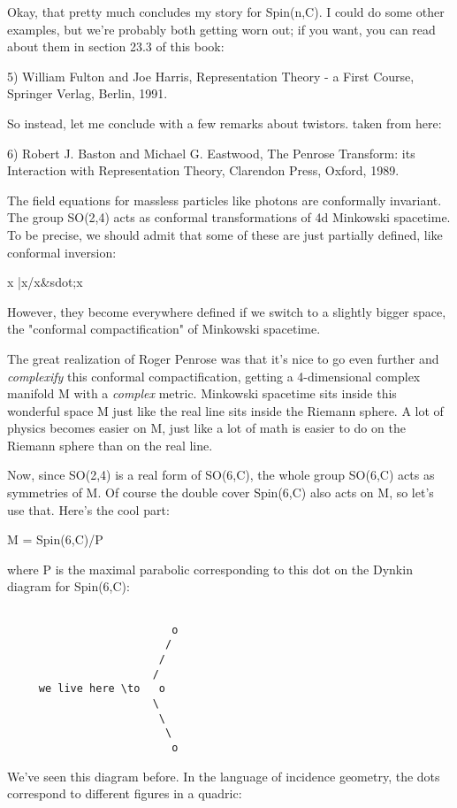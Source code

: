 Okay, that pretty much concludes my story for Spin(n,C).  I could
do some other examples, but we're probably both getting worn out;
if you want, you can read about them in section 23.3 of this book:

5)  William Fulton and Joe Harris, Representation Theory - a First
Course, Springer Verlag, Berlin, 1991.

So instead, let me conclude with a few remarks about twistors.
taken from here:

6) Robert J. Baston and Michael G. Eastwood, The Penrose Transform:
its Interaction with Representation Theory, Clarendon Press, Oxford,
1989.

The field equations for massless particles like photons are conformally
invariant.  The group SO(2,4) acts as conformal transformations of 4d
Minkowski spacetime.  To be precise, we should admit that some of these
are just partially defined, like conformal inversion:

x |\to  x/x&sdot;x

However, they become everywhere defined if we switch to a slightly
bigger space, the "conformal compactification" of Minkowski spacetime.

The great realization of Roger Penrose was that it's nice to go even
further and \emph{complexify} this conformal compactification, getting a
4-dimensional complex manifold M with a \emph{complex} metric.  Minkowski
spacetime sits inside this wonderful space M just like the real line
sits inside the Riemann sphere.  A lot of physics becomes easier on M,
just like a lot of math is easier to do on the Riemann sphere than on
the real line.

Now, since SO(2,4) is a real form of SO(6,C), the whole group 
SO(6,C) acts as symmetries of M.  Of course the double cover 
Spin(6,C) also acts on M, so let's use that.  Here's the cool part:

M = Spin(6,C)/P 

where P is the maximal parabolic corresponding to this dot on
the Dynkin diagram for Spin(6,C):


\begin{verbatim}

                          o
                         /
                        /
                       /
     we live here \to   o
                       \
                        \
                         \
                          o
\end{verbatim}
    
We've seen this diagram before.  In the language of incidence geometry,
the dots correspond to different figures in a quadric:



